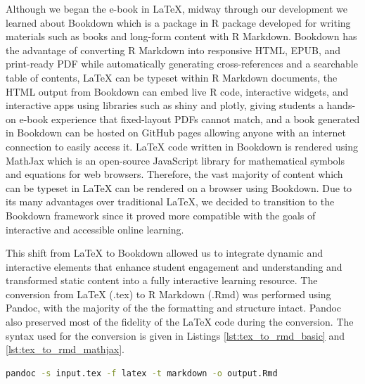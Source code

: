 \documentclass[11pt]{article}
\begin{document}
Although we began the e-book in LaTeX, midway through our development we learned about Bookdown which is a package in R package developed for writing materials such as books and long-form content with R Markdown. 
Bookdown has the advantage of converting R Markdown into responsive HTML, EPUB, and print-ready PDF while automatically generating cross-references and a searchable table of contents, LaTeX can be typeset within R Markdown documents, the HTML output from Bookdown can embed live R code, interactive widgets, and interactive apps using libraries such as shiny and plotly, giving students a hands-on e-book experience that fixed-layout PDFs cannot match, and a book generated in Bookdown can be hosted on GitHub pages allowing anyone with an internet connection to easily access it.
LaTeX code written in Bookdown is rendered using MathJax which is an open-source JavaScript library for mathematical symbols and equations for web browsers.
Therefore, the vast majority of content which can be typeset in LaTeX can be rendered on a browser using Bookdown.
Due to its many advantages over traditional LaTeX, we decided to transition to the Bookdown framework since it proved more compatible with the goals of interactive and accessible online learning. 

This shift from LaTeX to Bookdown allowed us to integrate dynamic and interactive elements that enhance student engagement and understanding and
transformed static content into a fully interactive learning resource.
The conversion from LaTeX (.tex) to R Markdown (.Rmd) was performed using Pandoc, with the majority of the the formatting and structure intact. Pandoc also preserved most of the fidelity of the LaTeX code during the conversion. 
The syntax used for the conversion is given in Listings \ref{lst:tex_to_rmd_basic} and \ref{lst:tex_to_rmd_mathjax}.\\

\begin{lstlisting}[language=bash,
                   caption={Basic conversion of a LaTeX .tex file to an R Markdown .Rmd file using Pandoc.},
                   label={lst:tex_to_rmd_basic},
                   captionpos=b] 
pandoc -s input.tex -f latex -t markdown -o output.Rmd
\end{lstlisting}
\end{document}

